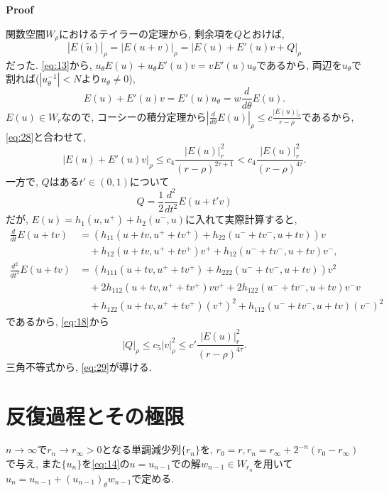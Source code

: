 \documentclass[a4paper]{ujarticle}
\makeatletter
\numberwithin{equation}{section}
\theoremstyle{definition}
\renewenvironment{proof}[1][Proof]{\par
  \pushQED{\qed}%
  \normalfont \topsep6\p@\@plus6\p@\relax
  \trivlist
  \item\relax
  {\bfseries
  #1\@addpunct{.}}\hspace\labelsep\ignorespaces
}{%
  \popQED\endtrivlist\@endpefalse
}
\makeatother
\begin{document}
        \begin{proof}
            関数空間$W_{\rho}$におけるテイラーの定理から, 剰余項を$Q$とおけば, 
            \[
                |E(\tilde{u})|_{\rho} = |E(u + v)|_{\rho} = |E(u) + E'(u) v + Q|_{\rho}
            \]
            だった. \eqref{eq:13}から, $u_{\theta} E(u) + u_{\theta} E'(u) v  = v E'(u) u_{\theta}$であるから,
            両辺を$u_{\theta}$で割れば($|u_{\theta}^{-1}| < N$より$u_{\theta} \neq 0$), 
            \[
                E(u) + E'(u) v = E'(u) u_{\theta} = w \frac{d}{d \theta} E(u).
            \]
            $E(u) \in W_{r}$なので, コーシーの積分定理から$\displaystyle \left|\frac{d}{d \theta} E(u)\right|_{\rho} \leq c \frac{|E(u)|_{r}}{r - \rho}$であるから,
            \eqref{eq:28}と合わせて, 
            \begin{equation}
                |E(u) + E'(u) v|_{\rho} \leq c_4 \frac{|E(u)|^2_{r}}{(r - \rho)^{2 \tau + 1}} < c_4 \frac{|E(u)|^2_{r}}{(r - \rho)^{4 \tau}}.
            \end{equation}
            一方で, $Q$はある$t' \in (0, 1)$について
            \[
                Q = \frac{1}{2} \frac{d^2}{d t^2} E(u + t' v)
            \]
            だが, $E(u) = h_1(u, u^{+}) + h_2(u^{-}, u)$に入れて実際計算すると,
            \begin{align}
               \frac{d}{d t} E(u + t v) &= (h_{11}(u + t v, u^{+} + t v^{+}) + h_{22}(u^{-} + t v^{-}, u + t v)) v \\
                &\quad + h_{12}(u + t v, u^{+} + t v^{+}) v^{+} +  h_{12}(u^{-} + t v^{-}, u + t v) v^{-},\\
               \frac{d^2}{d t^2} E(u + t v) &= (h_{111}(u + t v, u^{+} + t v^{+}) + h_{222}(u^{-} + t v^{-}, u + t v)) v^2 \\
               &\quad + 2 h_{112}(u + t v, u^{+} + t v^{+}) v v^{+} + 2 h_{122}(u^{-} + t v^{-}, u + t v) v^{-} v \\
               &\quad + h_{122}(u + t v, u^{+} + t v^{+}) (v^{+})^2 + h_{112}(u^{-} + t v^{-}, u + t v) (v^{-})^2 
            \end{align}
            であるから, \eqref{eq:18}から
            \begin{equation}
                |Q|_{\rho} \leq c_5 |v|^2_{\rho} \leq c'\frac{|E(u)|^2_{r}}{(r - \rho)^{4 \tau}}.
            \end{equation}
            三角不等式から, \eqref{eq:29}が導ける.
        \end{proof}

    \section{反復過程とその極限}
        $n \rightarrow \infty$で$r_{n} \rightarrow r_{\infty} > 0$となる単調減少列$\{r_n\}$を,
        $r_0 = r, r_{n} =  r_{\infty} + 2^{-n}(r_0 - r_{\infty}) $で与え,
        また$\{u_n\}$を\eqref{eq:14}の$u = u_{n-1}$での解$w_{n-1} \in W_{r_n}$を用いて$u_n = u_{n-1} + (u_{n-1})_{\theta} w_{n-1}$で定める.
        
\end{document}
